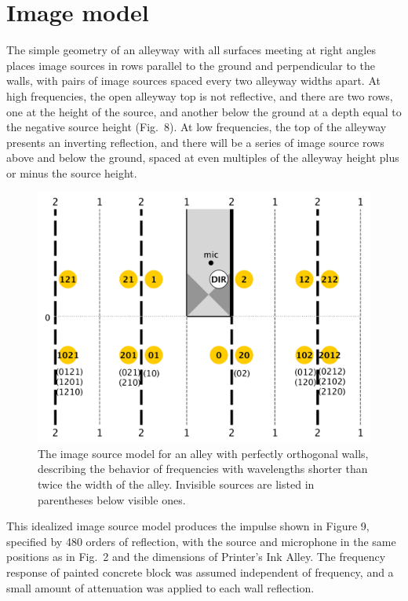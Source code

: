 \documentclass{aes137}
\begin{document}
\section{Image model}

The simple geometry of an alleyway with all surfaces meeting at right
angles places image sources in rows parallel to the ground and
perpendicular to the walls, with pairs of image sources spaced every
two alleyway widths apart. At high frequencies, the open alleyway top
is not reflective, and there are two rows, one at the height of the
source, and another below the ground at a depth equal to the negative
source height (Fig.~8). At low frequencies, the top of the alleyway
presents an inverting reflection, and there will be a series of image
source rows above and below the ground, spaced at even multiples of
the alleyway height plus or minus the source height.

\begin{figure}[h!] \centering \includegraphics[width=\linewidth]{images/ISM_uncanted_v2.pdf} 
\caption{The image source model for an alley with perfectly orthogonal walls, describing the behavior of frequencies with wavelengths shorter than twice the width of the alley. Invisible sources are listed in parentheses below visible ones.} 
\end{figure}

This idealized image source model produces the impulse shown in Figure 9, specified by 480 orders of reflection, with the source and microphone in the same positions as in Fig.~2 and the dimensions of Printer's Ink Alley. The frequency response of painted concrete block was assumed independent of frequency, and a small amount of attenuation was applied to each wall reflection.
\end{document}
